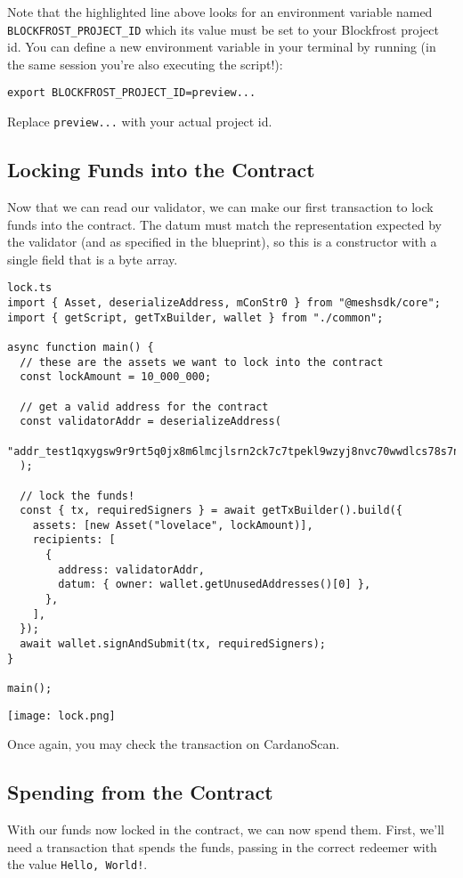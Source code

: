 Note that the highlighted line above looks for an environment variable named \texttt{BLOCKFROST\_PROJECT\_ID} which its value must be set to your Blockfrost project id. You can define a new environment variable in your terminal by running (in the same session you're also executing the script!):

\begin{verbatim}
export BLOCKFROST_PROJECT_ID=preview...
\end{verbatim}

Replace \texttt{preview...} with your actual project id.

\subsection{Locking Funds into the Contract}
Now that we can read our validator, we can make our first transaction to lock funds into the contract. The datum must match the representation expected by the validator (and as specified in the blueprint), so this is a constructor with a single field that is a byte array.

\begin{verbatim}
lock.ts
import { Asset, deserializeAddress, mConStr0 } from "@meshsdk/core";
import { getScript, getTxBuilder, wallet } from "./common";
 
async function main() {
  // these are the assets we want to lock into the contract
  const lockAmount = 10_000_000;
 
  // get a valid address for the contract
  const validatorAddr = deserializeAddress(
    "addr_test1qxygsw9r9rt5q0jx8m6lmcjlsrn2ck7c7tpekl9wzyj8nvc70wwdlcs78s7ntljtm6xqfvwzttttts33dtjpytldc7cs7dpjl7jqxyr9qyz3e"
  );
 
  // lock the funds!
  const { tx, requiredSigners } = await getTxBuilder().build({
    assets: [new Asset("lovelace", lockAmount)],
    recipients: [
      {
        address: validatorAddr,
        datum: { owner: wallet.getUnusedAddresses()[0] },
      },
    ],
  });
  await wallet.signAndSubmit(tx, requiredSigners);
}
 
main();
\end{verbatim}


\texttt{[image: lock.png]}


Once again, you may check the transaction on CardanoScan.

\subsection{Spending from the Contract}
With our funds now locked in the contract, we can now spend them. First, we'll need a transaction that spends the funds, passing in the correct redeemer with the value \texttt{Hello, World!}.

